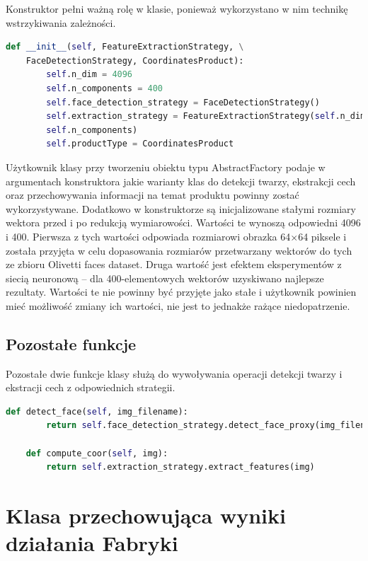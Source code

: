 \documentclass[oneside, eng]{mgr}
\begin{document}
Konstruktor pełni ważną rolę w klasie, ponieważ wykorzystano w nim technikę wstrzykiwania zależności.

\begin{lstlisting}[language=Python]
    def __init__(self, FeatureExtractionStrategy, \
    FaceDetectionStrategy, CoordinatesProduct):
        self.n_dim = 4096
        self.n_components = 400
        self.face_detection_strategy = FaceDetectionStrategy()
        self.extraction_strategy = FeatureExtractionStrategy(self.n_dim, \
        self.n_components)
        self.productType = CoordinatesProduct
\end{lstlisting}

Użytkownik klasy przy tworzeniu obiektu typu AbstractFactory podaje w argumentach konstruktora jakie warianty klas do detekcji twarzy, ekstrakcji cech oraz przechowywania informacji na temat produktu powinny zostać wykorzystywane. Dodatkowo w konstruktorze są inicjalizowane stałymi rozmiary wektora przed i po redukcją wymiarowości. Wartości te wynoszą odpowiedni 4096 i 400. Pierwsza z tych wartości odpowiada rozmiarowi obrazka 64$\times$64 piksele i została przyjęta w celu dopasowania rozmiarów przetwarzany wektorów do tych ze zbioru Olivetti faces dataset. Druga wartość jest efektem eksperymentów z siecią neuronową -- dla 400-elementowych wektorów uzyskiwano najlepsze rezultaty. Wartości te nie powinny być przyjęte jako stałe i użytkownik powinien mieć możliwość zmiany ich wartości, nie jest to jednakże rażące niedopatrzenie.

\subsection{Pozostałe funkcje}

Pozostałe dwie funkcje klasy służą do wywoływania operacji detekcji twarzy i ekstracji cech z odpowiednich strategii.

\begin{lstlisting}[language=Python]
    def detect_face(self, img_filename):
        return self.face_detection_strategy.detect_face_proxy(img_filename)

    def compute_coor(self, img):
        return self.extraction_strategy.extract_features(img)
\end{lstlisting}



\section{Klasa przechowująca wyniki działania Fabryki}
\end{document}
